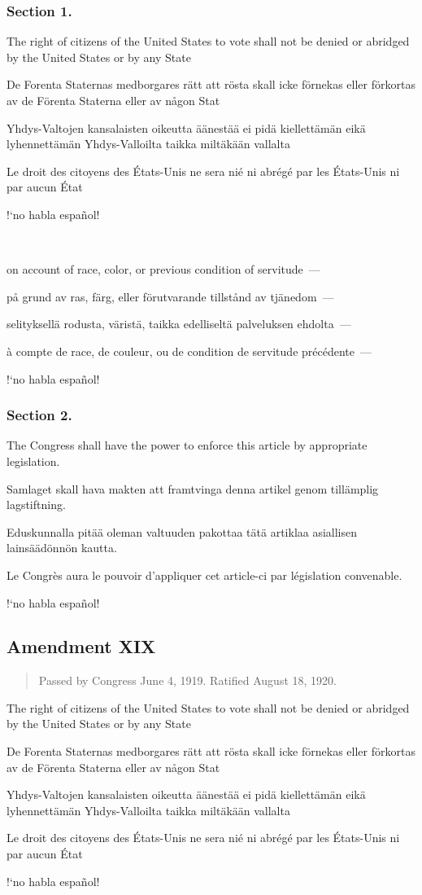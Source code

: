\documentclass[a4paper,landscape,10pt]{article}
\newcommand{\tblock}[5]{\noindent\begin{minipage}[t]{0.18\textwidth}\foreignlanguage{english}{#1}\end{minipage}\hskip 0.025\textwidth\begin{minipage}[t]{0.18\textwidth}\foreignlanguage{swedish}{#2}\end{minipage}\hskip 0.025\textwidth\begin{minipage}[t]{0.18\textwidth}\foreignlanguage{finnish}{#3}\end{minipage}\hskip 0.025\textwidth\begin{minipage}[t]{0.18\textwidth}\foreignlanguage{french}{#4}\end{minipage}\hskip 0.025\textwidth\begin{minipage}[t]{0.18\textwidth}\foreignlanguage{spanish}{#5}\end{minipage}}
\begin{document}
\subsubsection*{Section 1.}
\tblock
{The right of citizens of the United States to vote shall not be denied or abridged by the United States or by any State}
{De Forenta Staternas medborgares rätt att rösta skall icke förnekas eller förkortas av de Förenta Staterna eller av någon Stat}
{Yhdys-Valtojen kansalaisten oikeutta äänestää ei pidä kiellettämän eikä lyhennettämän Yhdys-Valloilta taikka miltäkään vallalta}
{Le droit des citoyens des États-Unis ne sera nié ni abrégé par les États-Unis ni par aucun État}
{!`no habla español!}

~

\tblock
{on account of race, color, or previous condition of servitude~---}
{på grund av ras, färg, eller förutvarande tillstånd av tjänedom~---}
{selityksellä rodusta, väristä, taikka edelliseltä palveluksen ehdolta~---}
{à compte de race, de couleur, ou de condition de servitude précédente~---}
{!`no habla español!}

\subsubsection*{Section 2.}
\tblock
{The Congress shall have the power to enforce this article by appropriate legislation.}
{Samlaget skall hava makten att framtvinga denna artikel genom tillämplig lagstiftning.}
{Eduskunnalla pitää oleman valtuuden pakottaa tätä artiklaa asiallisen lainsäädönnön kautta.}
{Le Congrès aura le pouvoir d'appliquer cet article-ci par législation convenable.}
{!`no habla español!}

\subsection*{Amendment XIX}
\begin{quote}\small
Passed by Congress June 4, 1919. Ratified August 18, 1920.
\end{quote}
\tblock
{The right of citizens of the United States to vote shall not be denied or abridged by the United States or by any State}
{De Forenta Staternas medborgares rätt att rösta skall icke förnekas eller förkortas av de Förenta Staterna eller av någon Stat}
{Yhdys-Valtojen kansalaisten oikeutta äänestää ei pidä kiellettämän eikä lyhennettämän Yhdys-Valloilta taikka miltäkään vallalta}
{Le droit des citoyens des États-Unis ne sera nié ni abrégé par les États-Unis ni par aucun État}
{!`no habla español!}
\end{document}
